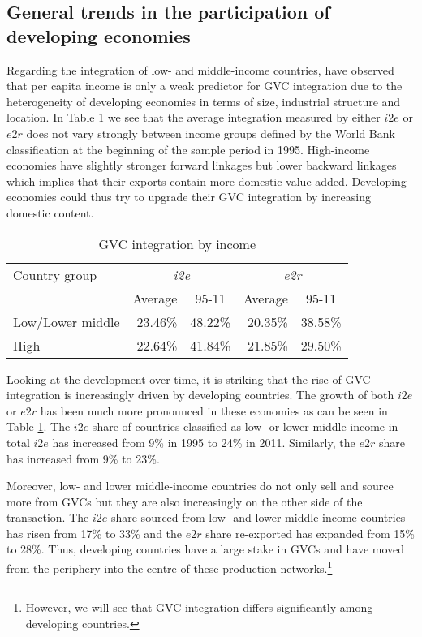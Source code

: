 \documentclass[11pt,a4paper]{article}
\begin{document}
\subsection{General trends in the participation of developing economies}

Regarding the integration of low- and middle-income countries, \citet{rojoguno12a} have observed that per capita income is only a weak predictor for GVC integration due to the heterogeneity of developing economies in terms of size, industrial structure and location. In Table \ref{tab:gvc} we see that the average integration measured by either $i2e$ or $e2r$ does not vary strongly between income groups defined by the World Bank classification at the beginning of the sample period in 1995. High-income economies have slightly stronger forward linkages but lower backward linkages which implies that their exports contain more domestic value added. Developing economies could thus try to upgrade their GVC integration by increasing domestic content.

\begin{table}[htbp]\small
  \centering
  \caption{GVC integration by income}
    \begin{tabular}{lrrrr}
    \toprule
    Country group & \multicolumn{2}{c}{\textit{i2e}} & \multicolumn{2}{c}{\textit{e2r}} \\
          & \multicolumn{1}{c}{Average} & \multicolumn{1}{c}{95-11} & \multicolumn{1}{c}{Average} & \multicolumn{1}{c}{95-11} \\
              \midrule
    Low/Lower middle & 23.46\% & 48.22\% & 20.35\% & 38.58\% \\
    High & 22.64\% & 41.84\% & 21.85\% & 29.50\% \\
    \bottomrule
    \end{tabular}
  \label{tab:gvc}
\end{table}

Looking at the development over time, it is striking that the rise of GVC integration is increasingly driven by developing countries. The growth of both $i2e$ or $e2r$ has been much more pronounced in these economies as can be seen in Table \ref{tab:gvc}. The $i2e$ share of countries classified as low- or lower middle-income in total $i2e$ has increased from 9\% in 1995 to 24\% in 2011. Similarly, the $e2r$ share has increased from 9\% to 23\%.

Moreover, low- and lower middle-income countries do not only sell and source more from GVCs but they are also increasingly on the other side of the transaction. The $i2e$ share sourced from low- and lower middle-income countries has risen from 17\% to 33\% and the $e2r$ share re-exported has expanded from 15\% to 28\%. Thus, developing countries have a large stake in GVCs and have moved from the periphery into the centre of these production networks.\footnote{However, we will see that GVC integration differs significantly among developing countries.}
\end{document}
